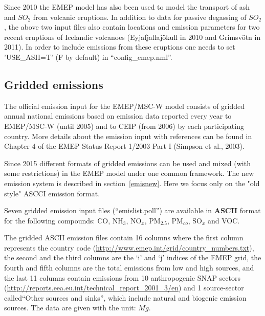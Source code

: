 \documentclass[a4paper,12pt]{report}
\begin{document}
Since 2010 the EMEP model has also been used to model the transport of
ash and $SO_2$ from volcanic eruptions. In addition to data for
passive degassing of $SO_2$, the above two input files also contain
locations and emission parameters for two recent eruptions of Icelandic
 volcanoes (Eyjafjallaj\"okull in 2010 and Grimsv\"otn in 2011). In
order to include emissions from these eruptions one needs to set
'USE\_ASH=T' (F by default) in ``config\_emep.nml''.



\subsection{Gridded emissions}

The official emission input for the EMEP/MSC-W model consists of
gridded 
annual national emissions based on emission data reported every year
to EMEP/MSC-W (until 2005) 
and to CEIP (from 2006) by each
participating country. 
More details about the emission input with references can be
found in Chapter 4 of the EMEP Status Report 1/2003 Part I 
(Simpson et al., 2003).

Since 2015 different formats of gridded emissions can be used and
mixed (with some restrictions) in the EMEP model under one common
framework. The new emission system is described in
section~\ref{emisnew}. Here we focus only on the "old style" ASCCI
emission format.  

Seven gridded emission input files (``emislist.poll'') are available
in  
{\bf ASCII} format for the following compounds: CO, NH$_{3}$,
NO$_{x}$, PM$_{2.5}$, PM$_{co}$, SO$_{x}$ and VOC.


The gridded ASCII emission files
contain 16 columns where the first column  
represents the country code
(\url{http://www.emep.int/grid/country_numbers.txt}), 
the second and the third columns are the `i' and `j' indices of the
EMEP grid, the fourth and fifth columns are the total emissions from
low and high sources, and the last 11 columns contain emissions from 
10 anthropogenic SNAP sectors 
(\url{http://reports.eea.eu.int/technical_report_2001_3/en}) and 1 
source-sector called``Other sources and sinks'', which include natural and
biogenic emission sources. The data are given with the unit: $Mg$.
\end{document}
